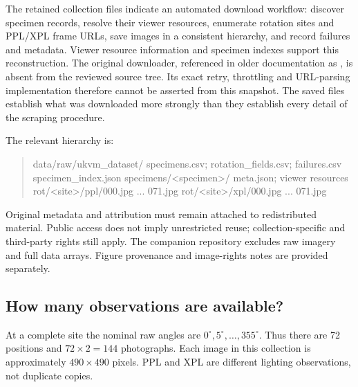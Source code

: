 The retained collection files indicate an automated download workflow: discover specimen records, resolve their viewer resources, enumerate rotation sites and PPL/XPL frame URLs, save images in a consistent hierarchy, and record failures and metadata. Viewer resource information and specimen indexes support this reconstruction. The original downloader, referenced in older documentation as , is absent from the reviewed source tree. Its exact retry, throttling and URL-parsing implementation therefore cannot be asserted from this snapshot. The saved files establish what was downloaded more strongly than they establish every detail of the scraping procedure.

The relevant hierarchy is:
\begin{quote}\small\ttfamily
data/raw/ukvm\_dataset/\newline
\hspace*{1em}specimens.csv; rotation\_fields.csv; failures.csv\newline
\hspace*{1em}specimen\_index.json\newline
\hspace*{1em}specimens/<specimen>/\newline
\hspace*{2em}meta.json; viewer resources\newline
\hspace*{2em}rot/<site>/ppl/000.jpg ... 071.jpg\newline
\hspace*{2em}rot/<site>/xpl/000.jpg ... 071.jpg
\end{quote}
Original metadata and attribution must remain attached to redistributed material. Public access does not imply unrestricted reuse; collection-specific and third-party rights still apply. The companion repository excludes raw imagery and full data arrays. Figure provenance and image-rights notes are provided separately.

\subsection{How many observations are available?}
At a complete site the nominal raw angles are $0^\circ,5^\circ,\ldots,355^\circ$. Thus there are 72 positions and $72\times2=144$ photographs. Each image in this collection is approximately $490\times490$ pixels. PPL and XPL are different lighting observations, not duplicate copies.

